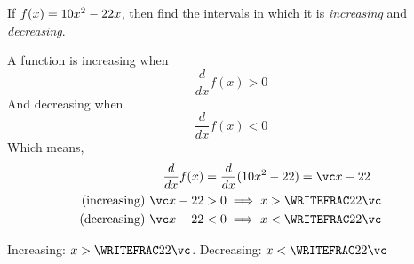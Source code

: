 

\MULTIPLY{}\vc

\question[1] If $f(x) = 10 x^2-22 x$, then find the intervals in which it is \textit{increasing} 
and \textit{decreasing}.

\watchout

\begin{solution}[\mcq]
  A function is increasing when 
  \[ \dfrac{d}{dx} f(x) > 0 \] 
  And decreasing when 
  \[ \dfrac{d}{dx} f(x) < 0 \] 
  Which means, 
  \begin{align}
    \dfrac{d}{dx} f(x) &= \dfrac{d}{dx}(\va x^2 - \vb) = \vc x - \vb \\
    \text{(increasing) }\vc x - \vb &> 0 \implies x > \WRITEFRAC\vb\vc \\
    \text{(decreasing) }\vc x - \vb &< 0 \implies x < \WRITEFRAC\vb\vc
  \end{align}
\end{solution}

\ifprintanswers\begin{codex}Increasing: $x>\WRITEFRAC\vb\vc$. Decreasing: $x < \WRITEFRAC\vb\vc$\end{codex}\fi
